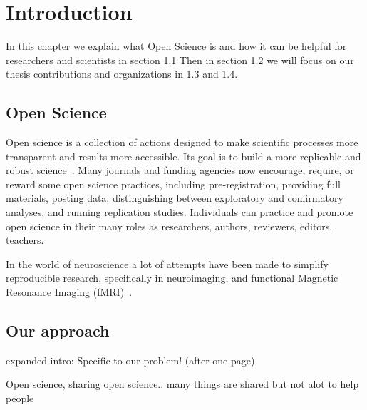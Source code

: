 \chapter{Introduction}
\label{introduction}

In this chapter we explain what Open Science is and how it can be helpful for researchers and scientists in section 1.1 Then in section 1.2 we will focus on our thesis contributions and organizations in 1.3 and 1.4.


\section{Open Science}

Open science is a collection of actions designed to make scientific processes more transparent and results more accessible. Its goal is to build a more replicable and robust science~\cite{spellman_gilbert_corker_2017}. 
Many journals and funding agencies now encourage, require, or reward some open science practices, including pre-registration, providing full materials, posting data, distinguishing between exploratory and confirmatory analyses, and running replication studies. Individuals can
practice and promote open science in their many roles as researchers, authors, reviewers, editors, teachers.

In the world of neuroscience a lot of attempts have been
made to simplify reproducible research, specifically in neuroimaging,
and functional Magnetic Resonance Imaging (fMRI)~\cite{Schöttner_2020}. 

\section{Our approach}

expanded intro:
Specific to our problem! (after one page)


Open science, sharing open science..
many things are shared but not alot to help people
  